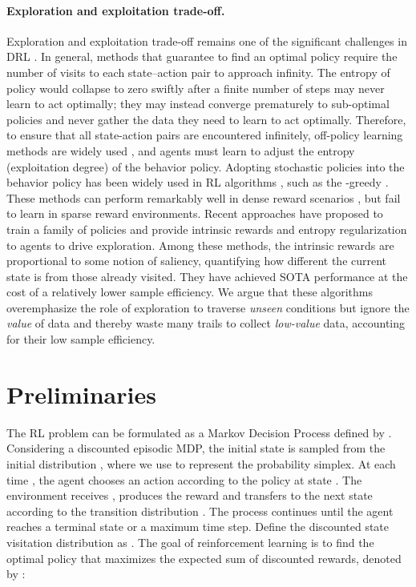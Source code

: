 \documentclass[nohyperref]{article}
\theoremstyle{plain}
\begin{document}
\paragraph{Exploration and exploitation trade-off. } Exploration and exploitation trade-off remains one of the significant  challenges in DRL \citep{ngu,sutton}.  In general, methods that guarantee to find an optimal policy require the number of visits to each state–action pair to approach infinity. The entropy of policy would collapse
to zero swiftly after a finite number of steps may never learn to act optimally; they may instead converge prematurely to sub-optimal policies and never gather the data they need to learn to act optimally. Therefore, to ensure that all state-action pairs are encountered infinitely, off-policy learning methods are widely used \citep{a3c,impala}, and agents must learn to adjust the entropy (exploitation degree) of the behavior policy. Adopting stochastic policies into the behavior policy has been widely used in RL algorithms \citep{dqn,rainbow}, such as the -greedy \citep{epsilongreedy}. These methods  can perform remarkably well in dense reward scenarios \citep{dqn}, but fail to learn in  sparse reward environments. Recent approaches \citep{agent57} have proposed to train a family of policies and provide  intrinsic rewards and entropy regularization to agents to drive exploration. Among these methods, the intrinsic rewards  are proportional to some notion of saliency, quantifying how different the current state is from those already visited.  They have achieved SOTA performance at the cost of a relatively lower sample efficiency.  We argue that these algorithms overemphasize the role of exploration to traverse \emph{unseen} conditions but ignore the \emph{value} of data and thereby waste many trails to collect \emph{low-value} data, accounting for their low sample efficiency.
\section{Preliminaries}

 The RL problem can be formulated as a Markov Decision Process \citep[MDP]{howard1960dynamic} defined by . 
 Considering a discounted episodic MDP, the initial state  is sampled from the initial distribution , where we use  to represent the probability simplex.
 At each time , the agent chooses an action  according to the policy  at state . 
 The environment receives , produces the reward  and transfers to the next state   according to the transition distribution . 
 The process continues until the agent reaches a terminal state or a maximum time step. 
 Define the discounted state visitation distribution as 
 .
 The goal of reinforcement learning is to find the optimal policy  that maximizes the expected sum of discounted rewards, denoted by  \citep{sutton}:
\end{document}
